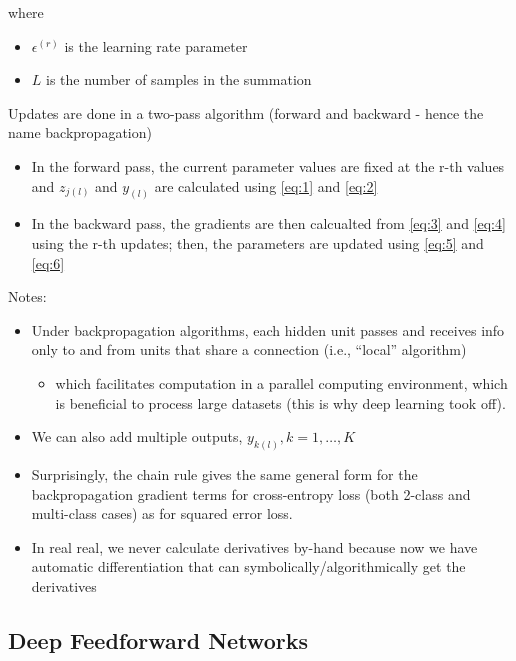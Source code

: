 \documentclass[
]{book}
\providecommand{\tightlist}{%
  \setlength{\itemsep}{0pt}\setlength{\parskip}{0pt}}
\begin{document}
where

\begin{itemize}
\item
  \(\epsilon^{(r)}\) is the learning rate parameter
\item
  \(L\) is the number of samples in the summation
\end{itemize}

Updates are done in a two-pass algorithm (forward and backward - hence the name backpropagation)

\begin{itemize}
\item
  In the forward pass, the current parameter values are fixed at the r-th values and \(z_{j(l)}\) and \(y_{(l)}\) are calculated using \eqref{eq:1} and \eqref{eq:2}
\item
  In the backward pass, the gradients are then calcualted from \eqref{eq:3} and \eqref{eq:4} using the r-th updates; then, the parameters are updated using \eqref{eq:5} and \eqref{eq:6}
\end{itemize}

Notes:

\begin{itemize}
\item
  Under backpropagation algorithms, each hidden unit passes and receives info only to and from units that share a connection (i.e., ``local'' algorithm)

  \begin{itemize}
  \tightlist
  \item
    which facilitates computation in a parallel computing environment, which is beneficial to process large datasets (this is why deep learning took off).
  \end{itemize}
\item
  We can also add multiple outputs, \(y_{k(l)}, k = 1, \dots, K\)
\item
  Surprisingly, the chain rule gives the same general form for the backpropagation gradient terms for cross-entropy loss (both 2-class and multi-class cases) as for squared error loss.
\item
  In real real, we never calculate derivatives by-hand because now we have automatic differentiation that can symbolically/algorithmically get the derivatives
\end{itemize}

\hypertarget{deep-feedforward-networks}{%
\subsection{Deep Feedforward Networks}\label{deep-feedforward-networks}}
\end{document}
